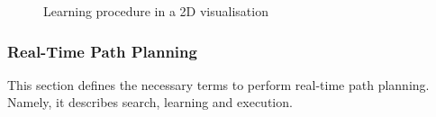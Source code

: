 \documentclass[thesis]{mas_proposal}
\begin{document}
\begin{figure}[h]
		\caption{Learning procedure in a 2D visualisation}
		\label{fig:path_planning_on_graph}
	\end{figure}   

	\subsubsection{Real-Time Path Planning}

	This section defines the necessary terms to perform real-time path planning. Namely, it describes search, learning and execution.
	
\end{document}
